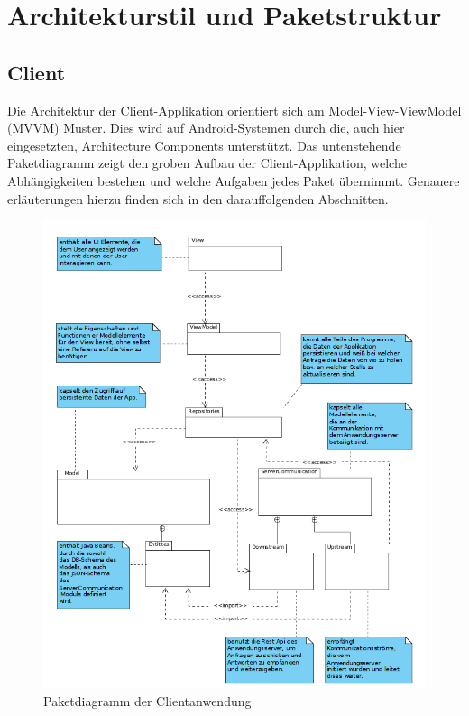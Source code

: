 \documentclass[11pt,a4paper]{report}
\begin{document}
\newpage

\section{Architekturstil und Paketstruktur}

\subsection{Client}
Die Architektur der Client-Applikation orientiert sich am Model-View-ViewModel (MVVM) Muster. Dies wird auf Android-Systemen durch die, auch hier eingesetzten, Architecture Components unterstützt. Das untenstehende Paketdiagramm zeigt den groben Aufbau der Client-Applikation, welche Abhängigkeiten bestehen und welche Aufgaben jedes Paket übernimmt. Genauere erläuterungen hierzu finden sich in den darauffolgenden Abschnitten.

\begin{figure}[H]
	\centering
	\includegraphics[scale=0.5]{../Klassendiagramme/paketdiagramm_client.png}
	\caption{Paketdiagramm der Clientanwendung}
\end{figure}
\end{document}
